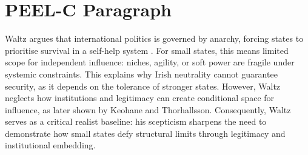 \documentclass[12pt,a4paper]{article}
\begin{document}
\section*{PEEL-C Paragraph}
Waltz argues that international politics is governed by anarchy, forcing states to prioritise survival in a self-help system \parencite{WALTZ_1969}. For small states, this means limited scope for independent influence: niches, agility, or soft power are fragile under systemic constraints. This explains why Irish neutrality cannot guarantee security, as it depends on the tolerance of stronger states. However, Waltz neglects how institutions and legitimacy can create conditional space for influence, as later shown by Keohane and Thorhallsson. Consequently, Waltz serves as a critical realist baseline: his scepticism sharpens the need to demonstrate how small states defy structural limits through legitimacy and institutional embedding.
\end{document}
